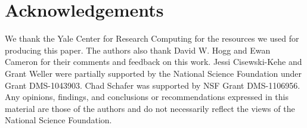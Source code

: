 \documentclass[ejs]{imsart}
\numberwithin{equation}{section}
\theoremstyle{plain}
\begin{document}
%
%
%
%

\section*{Acknowledgements}
We thank the Yale Center for Research Computing for the resources we used for producing this paper.
The authors also thank David W. Hogg and Ewan Cameron for their comments and feedback on this work.  
Jessi Cisewski-Kehe and Grant Weller were partially supported by the National Science Foundation under Grant DMS-1043903. 
Chad Schafer was supported by NSF Grant DMS-1106956.   Any opinions, findings, and conclusions or recommendations expressed in this material are those of the authors and do not necessarily reflect the views of the National Science Foundation.








\end{document}
